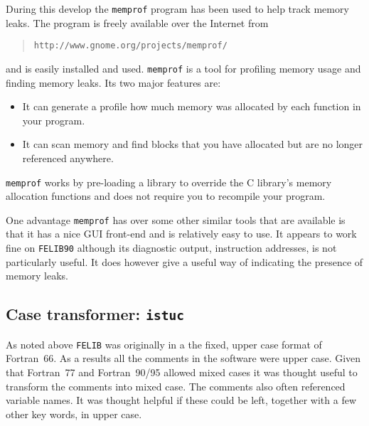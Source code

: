 \documentclass[a4paper,titlepage,11pt]{article}
\begin{document}
During this develop the {\tt memprof} program has been used to help track memory leaks. The
program is freely available over the Internet from 
\begin{quote}
{\tt http://www.gnome.org/projects/memprof/}
\end{quote}
and is easily installed and used. {\tt memprof} is a tool for profiling memory usage and finding 
memory leaks. Its two major features are:
\begin{itemize}
\item It can generate a profile how much memory was allocated by each 
function in your program.
\item It can scan memory and find blocks that you have allocated but are 
no longer referenced anywhere.
\end{itemize}
{\tt memprof} works by pre-loading a library to override the C library's memory allocation 
functions and does not require you to recompile your program.

One advantage {\tt memprof} has over some other similar tools that are available is that it 
has a nice GUI front-end and is relatively easy to use. It appears to work fine on {\tt FELIB90} 
although its diagnostic output, instruction addresses, is not particularly useful. It 
does however give a useful way of indicating the presence of memory leaks.

\subsection{Case transformer: {\tt istuc}}
As noted above {\tt FELIB} was originally in a the fixed, upper case format of Fortran~66. As
a results all the comments in the software were upper case. Given that Fortran~77 and Fortran~90/95
allowed mixed cases it was thought useful to transform the comments into mixed case. The
comments also often referenced variable names. It was thought helpful if these could be left, together
with a few other key words, in upper case.
\end{document}
